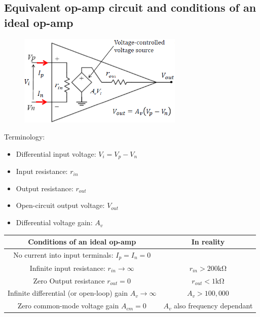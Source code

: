 \documentclass[class=report, crop=false, 12pt,a4paper]{standalone}
\begin{document}
\subsection{Equivalent op-amp circuit and conditions of an ideal op-amp}
\begin{figure}[H]
  \centering
  \includegraphics[width = 0.7\textwidth]{../img/diagram43.png}
\end{figure}
Terminology:
\begin{itemize}
  \item Differential input voltage: $V_i = V_p - V_n$
  \item Input resistance: $r_{in}$
  \item Output resistance: $r_{out}$
  \item Open-circuit output voltage: $V_{out}$
  \item Differential voltage gain: $A_v$
\end{itemize}
\begin{center}
  \begin{tabular}{ |c|c| } 
    \hline
    Conditions of an ideal op-amp & In reality \\
    \hline
    \hline
    No current into input terminals: $I_p = I_n = 0$ & \\
    \hline
    Infinite input resistance: $r_{in} \rightarrow \infty$ & $r_{in} > 200 \si{\kilo \ohm}$\\
    \hline
    Zero Output resistance $r_{out} = 0$ & $r_{out} < 1 \si{\kilo\ohm}$\\
    \hline
    Infinite differential (or open-loop) gain $A_v \rightarrow \infty$ & $A_v > 100,000$\\
    \hline
    Zero common-mode voltage gain $A_{cm} = 0$ & $A_v$ also frequency dependant\\
    \hline
  \end{tabular}
  \end{center}
\end{document}
